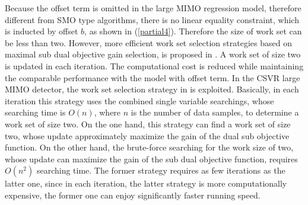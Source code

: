\documentclass[12pt, draftclsnofoot, onecolumn]{IEEEtran}
\begin{document}
\begin{spacing}{2}
Because the offset term is omitted in the large MIMO regression model, therefore different from SMO type algorithms, there is no linear equality constraint, which is inducted by offset $b$, as shown in (\ref{partial4}). Therefore the size of work set can be less than two. However, more efficient work set selection strategies based on maximal sub dual objective gain selection, is proposed in \cite{steinwart2011training}.   A work set of size two is updated in each iteration. The computational cost is reduced while maintaining the comparable performance with the model with offset term. In the CSVR large MIMO detector, the work set selection strategy in \cite{steinwart2011training} is exploited. Basically, in each iteration this strategy uses the combined single variable searchings, whose searching time is $O(n)$, where $n$ is the number of data samples, to determine a work set of size two. On the one hand, this strategy can find a work set of size two, whose update approximately maximize the gain of the dual sub objective function. On the other hand, the brute-force searching for the work size of two, whose update can maximize the gain of the sub dual objective function, requires $O(n^{2})$ searching time. The former strategy requires as few iterations as the latter one, since in each iteration, the latter strategy is more computationally expensive, the former one can enjoy significantly faster running speed.   

\end{spacing}
\end{document}
